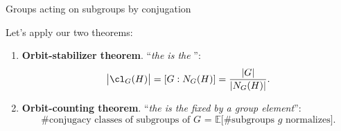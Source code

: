 \documentclass[8pt, handout]{beamer}
\newcommand{\Pause}{}      %
\begin{document}

\begin{frame}{Groups acting on subgroups by conjugation} %
  
  Let's apply our two theorems: 
  \begin{enumerate}
  \item \textbf{Orbit-stabilizer theorem}. ``\emph{the  is the }'': \Pause
    \[
    \big|\cl_G(H)\big|=[G:N_G(H)]=\frac{|G|}{|N_G(H)|}.
    \]
    
    \vspace{-2mm}\Pause
    
  \item \textbf{Orbit-counting theorem}. ``\emph{the  is the  fixed by a
    group element}'': \Pause
    \[
    \text{\#conjugacy classes of subgroups of $G$ = $\mathbb{E}\big[\text{\# subgroups $g$ normalizes}\big]$}.
    \]
  \end{enumerate}
  
  \Pause\vspace{-1mm}
  

\end{frame}
\end{document}
